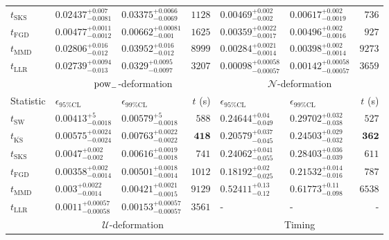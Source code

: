\begin{tabular}{l|llr|llr}
	$t_{\mathrm{SKS}}$ & $0.02437_{-0.0081}^{+0.007}$ & $0.03375_{-0.0069}^{+0.0066}$ & $1128$ & $0.00469_{-0.002}^{+0.002}$ & $0.00617_{-0.0019}^{+0.002}$ & $736$ \\
	$t_{\mathrm{FGD}}$ & ${\mathbf{0.00477_{-0.0012}^{+0.0011}}}$ & ${\mathbf{0.00662_{-0.001}^{+0.00081}}}$ & $1625$ & $0.00359_{-0.0017}^{+0.0022}$ & $0.00496_{-0.0016}^{+0.002}$ & $927$ \\
	$t_{\mathrm{MMD}}$ & $0.02806_{-0.012}^{+0.016}$ & $0.03952_{-0.012}^{+0.016}$ & $8999$ & ${\mathbf{0.00284_{-0.0014}^{+0.0021}}}$ & ${\mathbf{0.00398_{-0.0014}^{+0.002}}}$ & $9273$ \\
	$t_{\mathrm{LLR}}$ & $0.02739_{-0.013}^{+0.0094}$ & $0.0329_{-0.0097}^{+0.0095}$ & $3207$ & $0.00098_{-0.00057}^{+0.00058}$ & $0.00142_{-0.00057}^{+0.00058}$ & $3659$ \\
	\toprule
	\multicolumn{1}{c}{} & \multicolumn{3}{c}{$\rm{pow}_{-}$-deformation} & \multicolumn{3}{c}{$\mathcal{N}$-deformation} \\
	Statistic & $\epsilon_{95\%\mathrm{CL}}$ & $\epsilon_{99\%\mathrm{CL}}$ & $t$ (s) & $\epsilon_{95\%\mathrm{CL}}$ & $\epsilon_{99\%\mathrm{CL}}$ & $t$ (s) \\
	\midrule
	$t_{\mathrm{SW}}$ & $0.00413_{-0.0018}^{+5}$ & $0.00579_{-0.0018}^{+5}$ & $588$ & $0.24644_{-0.049}^{+0.04}$ & $0.29702_{-0.038}^{+0.032}$ & $527$ \\
	$t_{\overline{\mathrm{KS}}}$ & $0.00575_{-0.0024}^{+0.0024}$ & $0.00763_{-0.0022}^{+0.0022}$ & ${\mathbf{418}}$ & $0.20579_{-0.045}^{+0.037}$ & $0.24503_{-0.032}^{+0.029}$ & ${\mathbf{362}}$ \\
	$t_{\mathrm{SKS}}$ & $0.0047_{-0.002}^{+0.002}$ & $0.00616_{-0.0018}^{+0.0019}$ & $741$ & $0.24062_{-0.055}^{+0.041}$ & $0.28403_{-0.039}^{+0.036}$ & $611$ \\
	$t_{\mathrm{FGD}}$ & $0.00358_{-0.0014}^{+0.002}$ & $0.00501_{-0.0014}^{+0.0018}$ & $1012$ & ${\mathbf{0.18192_{-0.025}^{+0.02}}}$ & ${\mathbf{0.21532_{-0.016}^{+0.014}}}$ & $787$ \\
	$t_{\mathrm{MMD}}$ & ${\mathbf{0.003_{-0.0014}^{+0.0022}}}$ & ${\mathbf{0.00421_{-0.0015}^{+0.0021}}}$ & $9129$ & $0.52411_{-0.12}^{+0.13}$ & $0.61773_{-0.098}^{+0.11}$ & $6538$ \\
	$t_{\mathrm{LLR}}$ & $0.0011_{-0.00058}^{+0.00057}$ & $0.00153_{-0.00057}^{+0.00057}$ & $3561$ & - & - & - \\
	\toprule
	\multicolumn{1}{c}{} & \multicolumn{3}{c}{$\mathcal{U}$-deformation} & \multicolumn{3}{c}{Timing} \\

\end{tabular}
